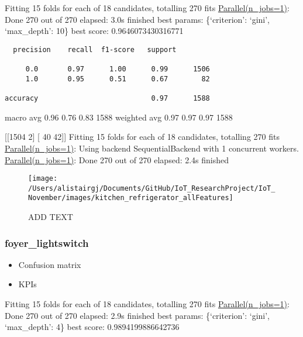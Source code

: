 \documentclass[11pt,]{article}
\providecommand{\tightlist}{%
  \setlength{\itemsep}{0pt}\setlength{\parskip}{0pt}}
\begin{document}
Fitting 15 folds for each of 18 candidates, totalling 270 fits
\href{Done\%20270\%20out\%20of\%20270\%20\%7C\%20elapsed:\%202.1s\%20finished}{Parallel(n\_jobs=1)}:
Done 270 out of 270 \textbar{} elapsed: 3.0s finished best params:
\{`criterion': `gini', `max\_depth': 10\} best score: 0.9646073430316771

\begin{verbatim}
  precision    recall  f1-score   support

     0.0       0.97      1.00      0.99      1506
     1.0       0.95      0.51      0.67        82

accuracy                           0.97      1588
\end{verbatim}

macro avg 0.96 0.76 0.83 1588 weighted avg 0.97 0.97 0.97 1588

{[}{[}1504 2{]} {[} 40 42{]}{]} Fitting 15 folds for each of 18
candidates, totalling 270 fits
\href{Done\%20270\%20out\%20of\%20270\%20\%7C\%20elapsed:\%202.1s\%20finished}{Parallel(n\_jobs=1)}:
Using backend SequentialBackend with 1 concurrent workers.
\href{Done\%20270\%20out\%20of\%20270\%20\%7C\%20elapsed:\%202.1s\%20finished}{Parallel(n\_jobs=1)}:
Done 270 out of 270 \textbar{} elapsed: 2.4s finished

\begin{figure}[H]

{\centering \texttt{[image: /Users/alistairgj/Documents/GitHub/IoT\_ResearchProject/IoT\_November/images/kitchen\_refrigerator\_allFeatures]} 

}

\caption{ADD TEXT}\label{fig:unnamed-chunk-8}
\end{figure}

\pagebreak

\hypertarget{foyer_lightswitch}{%
\subsubsection{foyer\_lightswitch}\label{foyer_lightswitch}}

\begin{itemize}
\tightlist
\item
  Confusion matrix
\item
  KPIs
\end{itemize}

Fitting 15 folds for each of 18 candidates, totalling 270 fits
\href{Done\%20270\%20out\%20of\%20270\%20\%7C\%20elapsed:\%202.1s\%20finished}{Parallel(n\_jobs=1)}:
Done 270 out of 270 \textbar{} elapsed: 2.9s finished best params:
\{`criterion': `gini', `max\_depth': 4\} best score: 0.9894199886642736
\end{document}
